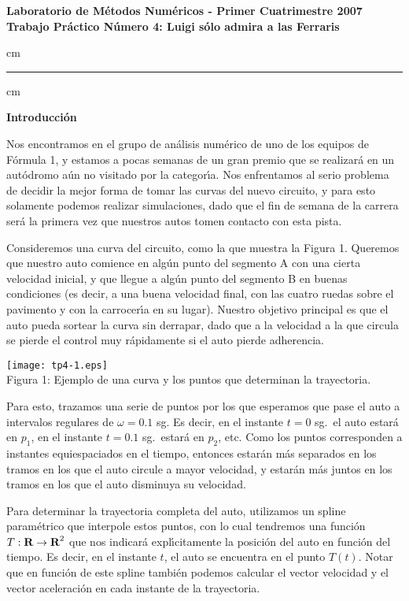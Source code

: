 \documentclass[11pt, a4paper]{article}
\newcommand{\real}{\hbox{\bf R}}
\begin{document}
\begin{centering}
\bf Laboratorio de M\'etodos Num\'ericos - Primer Cuatrimestre 2007 \\
\bf Trabajo Pr\'actico N\'umero 4: Luigi s\'olo admira a las Ferraris \\
\end{centering}

 cm
\hrule
{} cm

\textbf{Introducci\'on}

Nos encontramos en el grupo de an\'alisis num\'erico de uno de los equipos de
F\'ormula 1, y estamos a pocas semanas de un gran premio que se realizar\'a
en un aut\'odromo a\'un no visitado por la categor\'\i a. Nos enfrentamos
al serio problema de decidir la mejor forma de tomar las curvas del nuevo
circuito, y para esto solamente podemos realizar simulaciones, dado que
el fin de semana de la carrera ser\'a la primera vez que nuestros autos
tomen contacto con esta pista.

Consideremos una curva del circuito, como la que muestra la Figura 1.
Queremos que nuestro auto comience en alg\'un punto del segmento A con
una cierta velocidad inicial, y que llegue a alg\'un punto del segmento B en
buenas condiciones (es decir, a una buena velocidad final, con las cuatro
ruedas sobre el pavimento y con la carrocer\'\i a en su lugar). Nuestro
objetivo principal es que el auto pueda sortear la curva sin derrapar, dado
que a la velocidad a la que circula se pierde el control muy r\'apidamente
si el auto pierde adherencia.

\vskip 11pt

\begin{centering}
\texttt{[image: tp4-1.eps]} \\
Figura 1: Ejemplo de una curva y los puntos que determinan la trayectoria. \\
\end{centering}

\vskip 11pt

Para esto, trazamos una serie de puntos por los que esperamos que pase
el auto a intervalos regulares de $\omega = 0.1$ sg. Es decir, en el
instante $t=0$ sg.~el auto estar\'a en $p_1$, en el instante
$t=0.1$ sg.~estar\'a en $p_2$, etc. Como los puntos corresponden a
instantes equiespaciados en el tiempo, entonces estar\'an m\'as separados
en los tramos en los que el auto circule a mayor velocidad, y estar\'an
m\'as juntos en los tramos en los que el auto disminuya su velocidad.

Para determinar la trayectoria
completa del auto, utilizamos un spline param\'etrico que interpole estos
puntos, con lo cual tendremos una funci\'on $T:\real\to\real^2$ que nos
indicar\'a expl\'\i citamente la posici\'on del auto en funci\'on del tiempo.
Es decir, en el instante $t$, el auto se encuentra en el punto $T(t)$. Notar
que en funci\'on de este spline tambi\'en podemos calcular el vector velocidad y
el vector aceleraci\'on en cada instante de la trayectoria.
\end{document}

